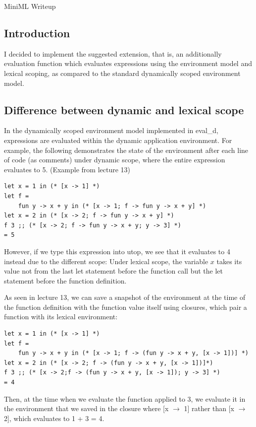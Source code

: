 \documentclass[submit]{harvardml}
\begin{document}
\begin{center}
{\Large MiniML Writeup}\\
\end{center}

\subsection*{Introduction}
I decided to implement the suggested extension, that is, an additionally evaluation function which evaluates expressions using the environment model and lexical scoping, as compared to the standard dynamically scoped environment model.

\subsection*{Difference between dynamic and lexical scope}

In the dynamically scoped environment model implemented in eval\_d, expressions are evaluated within the dynamic application environment. For example, the following demonstrates the state of the environment after each line of code (as comments) under dynamic scope, where the entire expression evaluates to 5. (Example from lecture 13)
\begin{lstlisting}
let x = 1 in (* [x -> 1] *)
let f =
	fun y -> x + y in (* [x -> 1; f -> fun y -> x + y] *)
let x = 2 in (* [x -> 2; f -> fun y -> x + y] *)
f 3 ;; (* [x -> 2; f -> fun y -> x + y; y -> 3] *)
= 5
\end{lstlisting}

However, if we type this expression into utop, we see that it evaluates to 4 instead due to the different scope: Under lexical scope, the variable $x$ takes its value not from the last let statement before the function call but the let statement before the function definition. 

As seen in lecture 13, we can save a snapshot of the environment at the time of the function definition with the function value itself using closures, which pair a function with its lexical environment:
\begin{lstlisting}
let x = 1 in (* [x -> 1] *)
let f =
	fun y -> x + y in (* [x -> 1; f -> (fun y -> x + y, [x -> 1])] *)
let x = 2 in (* [x -> 2; f -> (fun y -> x + y, [x -> 1])]*)
f 3 ;; (* [x -> 2;f -> (fun y -> x + y, [x -> 1]); y -> 3] *)
= 4
\end{lstlisting}

Then, at the time when we evaluate the function applied to 3, we evaluate it in the environment that we saved in the closure where [x $\rightarrow$ 1] rather than [x $\rightarrow$ 2], which evaluates to 1 + 3 = 4.
\end{document}
